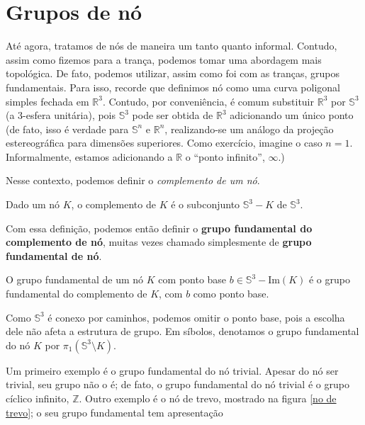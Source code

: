 	\section{Grupos de nó}
	\hspace{12pt} Até agora, tratamos de nós de maneira um tanto quanto informal. Contudo, assim como fizemos para a trança, podemos tomar uma abordagem mais topológica. De fato, podemos utilizar, assim como foi com as tranças, grupos fundamentais. Para isso, recorde que definimos nó como uma curva poligonal simples fechada em $\mathbb{R}^3$. Contudo, por conveniência, é comum substituir $\mathbb{R}^3$ por $\mathbb{S}^3$ (a 3-esfera unitária), pois $\mathbb{S}^3$ pode ser obtida de $\mathbb{R}^3$ adicionando um único ponto (de fato, isso é verdade para $\mathbb{S}^n$ e $\mathbb{R}^n$, realizando-se um análogo da projeção estereográfica para dimensões superiores. Como exercício, imagine o caso $n = 1$. Informalmente, estamos adicionando a $\mathbb{R}$ o ``ponto infinito'', $\infty$.)
	\par\vspace{0.3cm} Nesse contexto, podemos definir o \textit{complemento de um nó}.
	\begin{deff}
		\label{def complemento no}
		Dado um nó $K$, o complemento de $K$ é o subconjunto $\mathbb{S}^3 - K$ de $\mathbb{S}^3$.
	\end{deff}
	\par\vspace{0.3cm} Com essa definição, podemos então definir o \textbf{grupo fundamental do complemento de nó}, muitas vezes chamado simplesmente de \textbf{grupo fundamental de nó}.
	\begin{deff}
		\label{grupo fundamental de no}
		O grupo fundamental de um nó $K$ com ponto base $b\in\mathbb{S}^3 - \text{Im}(K)$ é o grupo fundamental do complemento de $K$, com $b$ como ponto base.
	\end{deff}
	\par\vspace{0.3cm} Como $\mathbb{S}^3$ é conexo por caminhos, podemos omitir o ponto base, pois a escolha dele não afeta a estrutura de grupo. Em síbolos, denotamos o grupo fundamental do nó $K$ por $\pi_1(\mathbb{S}^3\setminus K)$. 
	\par\vspace{0.3cm} Um primeiro exemplo é o grupo fundamental do nó trivial. Apesar do nó ser trivial, seu grupo não o é; de fato, o grupo fundamental do nó trivial é o grupo cíclico infinito, $\mathbb{Z}$. Outro exemplo é o nó de trevo, mostrado na figura \eqref{no de trevo}; o seu grupo fundamental tem apresentação 
